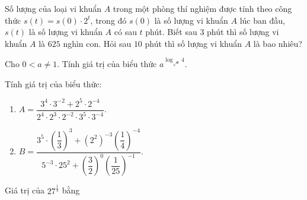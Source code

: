 \begin{ex}%
	Số lượng của loại vi khuẩn $A$ trong một phòng thí nghiệm được tính theo công thức $s(t)=s(0)\cdot 2^t$, trong đó $s(0)$ là số lượng vi  khuẩn $A$ lúc ban đầu, $s(t)$ là số lượng vi khuẩn $A$ có sau $t$ phút. Biết sau $3$ phút thì số lượng vi khuẩn $A$ là $625$ nghìn con. Hỏi sau $10$ phút thì số lượng vi khuẩn $A$ là bao nhiêu?
\end{ex}

\begin{ex}%
	Cho  $0<a\neq 1$. Tính giá trị của biểu thức $a^{\log_{\sqrt{a}}4}$.
\end{ex}

\begin{ex}%
	Tính giá trị  của biểu thức:
	\begin{enumerate}
		 \item $A=\dfrac{3^4\cdot3^{-2}+2^5\cdot2^{-4}}{2^4\cdot2^3\cdot2^{-2}\cdot3^5\cdot3^{-4}}$.
		 \item $B=\dfrac{3^5 \cdot\left(\dfrac{1}{3}\right)^3+\left(2^2\right)^{-3}\left(\dfrac{1}{4}\right)^{-4}}{5^{-3} \cdot 25^2+\left(\dfrac{3}{2}\right)^0\left(\dfrac{1}{25}\right)^{-1}}$.
	\end{enumerate}
\end{ex}

\begin{ex}%
	Giá trị của  $27^{\tfrac{1}{3}}$ bằng
\end{ex}

